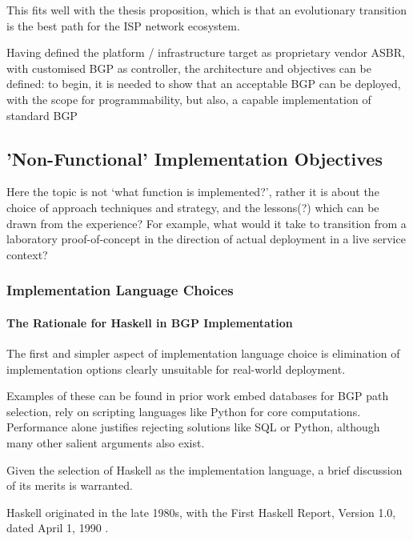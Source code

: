 This fits well with the thesis proposition, which is that an evolutionary transition is the best path for the ISP network ecosystem.

\bigskip
Having defined the platform / infrastructure target as proprietary vendor ASBR, with customised BGP as controller, the architecture and objectives can be defined:
to begin, it is needed to show that an acceptable BGP can be deployed, with the scope for programmability, but also, a capable implementation of standard BGP

\subsection{'Non-Functional' Implementation Objectives}
Here the topic is not `what function is implemented?', rather it is about the choice of approach techniques and strategy, and the lessons(?) which can be drawn from the experience?  For example, what would it take to transition from a laboratory proof-of-concept in the direction of actual deployment in a live service context?


\subsubsection{Implementation Language Choices}

\paragraph{The Rationale for Haskell in BGP Implementation}

The first and simpler aspect of implementation language choice is elimination of implementation options clearly unsuitable for real-world deployment.

Examples of these can be found in prior work embed databases for BGP path selection, rely on scripting languages like Python for core computations. Performance alone justifies rejecting solutions like SQL or Python, although many other salient arguments also exist.

Given the selection of Haskell as the implementation language, a brief discussion of its merits is warranted.

Haskell originated in the late 1980s, with the First Haskell Report, Version 1.0, dated April 1, 1990 \cite{history}.

